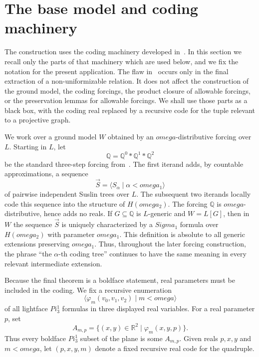 \documentclass{article}
\theoremstyle{remark}
\theoremstyle{plain}
\newcommand{\forceQ}{\mathbb{Q}}
\newcommand{\Real}{\mathbb{R}}
\def\mathbf#1{#1}%
\def\Pi{Pi}%
\def\Sigma{Sigma}%
\def\omega{omega}%
\begin{document}
\section{The base model and coding machinery}\label{sec:base}
The construction uses the coding machinery developed in~\cite{HOFFELNER2023103292}. In this section we recall only the parts of that machinery which are used below, and we fix the notation for the present application. The flaw in~\cite{HOFFELNER2023103292} occurs only in the final extraction of a non-uniformizable relation. It does not affect the construction of the ground model, the coding forcings, the product closure of allowable forcings, or the preservation lemmas for allowable forcings. We shall use those parts as a black box, with the coding real replaced by a recursive code for the tuple relevant to a projective graph.

We work over a ground model $W$ obtained by an $\omega$-distributive forcing over $L$. Starting in $L$, let
\[
   \forceQ=\forceQ^0*\forceQ^1*\forceQ^2
\]
be the standard three-step forcing from~\cite{HOFFELNER2023103292}. The first iterand adds, by countable approximations, a sequence
\[
   \vec S=\langle S_\alpha\mid \alpha<\omega_1\rangle
\]
of pairwise independent Suslin trees over $L$. The subsequent two iterands locally code this sequence into the structure of $H(\omega_2)$. The forcing $\forceQ$ is $\omega$-distributive, hence adds no reals. If $G\subseteq\forceQ$ is $L$-generic and $W=L[G]$, then in $W$ the sequence $\vec S$ is uniquely characterized by a $\Sigma_1$ formula over $H(\omega_2)$ with parameter $\omega_1$. This definition is absolute to all generic extensions preserving $\omega_1$. Thus, throughout the later forcing construction, the phrase ``the $\alpha$-th coding tree'' continues to have the same meaning in every relevant intermediate extension.

Because the final theorem is a boldface statement, real parameters must be included in the coding. We fix a recursive enumeration
\[
   \langle \varphi_m(v_0,v_1,v_2)\mid m<\omega\rangle
\]
of all lightface $\Pi^1_3$ formulas in three displayed real variables. For a real parameter $p$, set
\[
   A_{m,p}=\{(x,y)\in\Real^2\mid \varphi_m(x,y,p)\}.
\]
Thus every boldface $\mathbf{\Pi}^1_3$ subset of the plane is some $A_{m,p}$. Given reals $p,x,y$ and $m<\omega$, let $(p,x,y,m)$ denote a fixed recursive real code for the quadruple.
\end{document}
